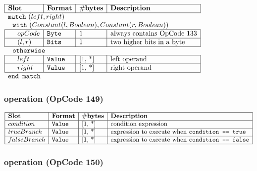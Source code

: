 \noindent
\(\begin{array}{| l | l | l | l |}
    \hline
    \bf{Slot} & \bf{Format} & \bf{\#bytes} & \bf{Description} \\
    \hline
        \multicolumn{4}{l}{\lst{match}~(left, right)} \\
         
    \multicolumn{4}{l}{~~\lst{with}~(Constant(l, Boolean), Constant(r, Boolean)) } \\
    \hline
            ~~~~ opCode & \lst{Byte} & \text{1} & \text{always contains OpCode 133} \\
    \hline
          ~~~~ (l,r) & \lst{Bits} & \text{1} & \text{two higher bits in a byte} \\
    \hline
      
    \multicolumn{4}{l}{~~\lst{otherwise} } \\
    \hline
            ~~~~ left & \lst{Value} & \text{[1, *]} & \text{left operand} \\
    \hline
          ~~~~ right & \lst{Value} & \text{[1, *]} & \text{right operand} \\
    \hline
          \multicolumn{4}{l}{\lst{end match}} \\
\end{array}\)
       

\subsubsection{ operation (OpCode 149)}

\noindent
\(\begin{array}{| l | l | l | l |}
    \hline
    \bf{Slot} & \bf{Format} & \bf{\#bytes} & \bf{Description} \\
    \hline
         condition & \lst{Value} & \text{[1, *]} & \text{condition expression} \\
    \hline
           trueBranch & \lst{Value} & \text{[1, *]} & \text{expression to execute when \lst{condition == true}} \\
    \hline
           falseBranch & \lst{Value} & \text{[1, *]} & \text{expression to execute when \lst{condition == false}} \\
    \hline
      
\end{array}\)
       

\subsubsection{ operation (OpCode 150)}

